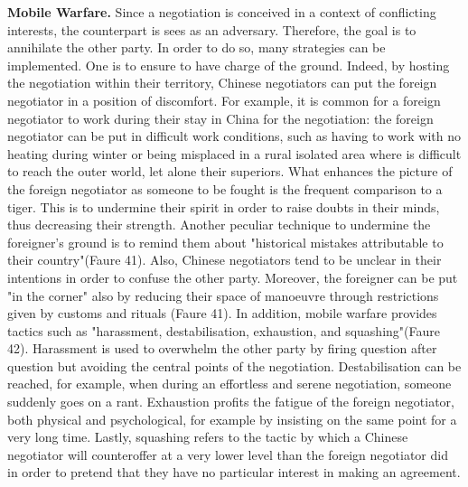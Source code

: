 \documentclass[../main.tex]{subfiles}
\begin{document}
\textbf{Mobile Warfare.} Since a negotiation is conceived in a context of conflicting interests, the counterpart is sees as an adversary. Therefore, the goal is to annihilate the other party. In order to do so, many strategies can be implemented. One is to ensure to have charge of the ground. Indeed, by hosting the negotiation within their territory, Chinese negotiators can put the foreign negotiator in a position of discomfort. For example, it is common for a foreign negotiator to work during their stay in China for the negotiation: the foreign negotiator can be put in difficult work conditions, such as having to work with no heating during winter or being misplaced in a rural isolated area where is difficult to reach the outer world, let alone their superiors.
What enhances the picture of the foreign negotiator as someone to be fought is the frequent comparison to a tiger. This is to undermine their spirit in order to raise doubts in their minds, thus decreasing their strength. Another peculiar technique to undermine the foreigner's ground is to remind them about "historical mistakes attributable to their country"(Faure 41). Also, Chinese negotiators tend to be unclear in their intentions in order to confuse the other party. Moreover, the foreigner can be put "in the corner" also by reducing their space of manoeuvre through restrictions given by customs and rituals (Faure 41).
In addition, mobile warfare provides tactics such as "harassment, destabilisation, exhaustion, and squashing"(Faure 42).
Harassment is used to overwhelm the other party by firing question after question but avoiding the central points of the negotiation.
Destabilisation can be reached, for example, when during an effortless and serene negotiation, someone suddenly goes on a rant.
Exhaustion profits the fatigue of the foreign negotiator, both physical and psychological, for example by insisting on the same point for a very long time.
Lastly, squashing refers to the tactic by which a Chinese negotiator will counteroffer at a very lower level than the foreign negotiator did in order to pretend that they have no particular interest in making an agreement.
\end{document}
